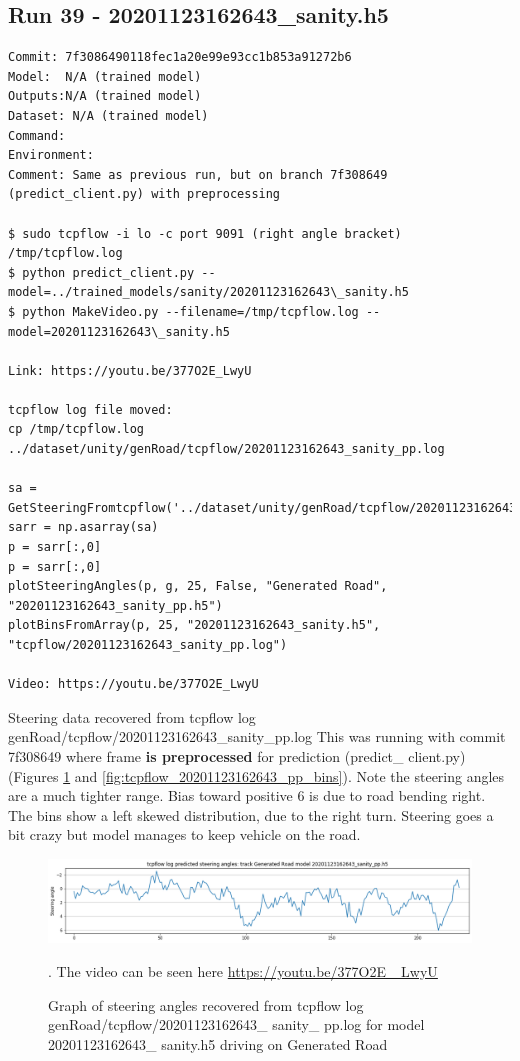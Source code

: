 \subsection{Run 39 - 20201123162643\_sanity.h5}
\begin{verbatim}
Commit: 7f3086490118fec1a20e99e93cc1b853a91272b6
Model:  N/A (trained model)
Outputs:N/A (trained model)
Dataset: N/A (trained model)
Command: 
Environment: 
Comment: Same as previous run, but on branch 7f308649 (predict_client.py) with preprocessing

$ sudo tcpflow -i lo -c port 9091 (right angle bracket) /tmp/tcpflow.log
$ python predict_client.py --model=../trained_models/sanity/20201123162643\_sanity.h5
$ python MakeVideo.py --filename=/tmp/tcpflow.log --model=20201123162643\_sanity.h5

Link: https://youtu.be/377O2E_LwyU

tcpflow log file moved:
cp /tmp/tcpflow.log ../dataset/unity/genRoad/tcpflow/20201123162643_sanity_pp.log

sa = GetSteeringFromtcpflow('../dataset/unity/genRoad/tcpflow/20201123162643_sanity_pp.log')
sarr = np.asarray(sa)
p = sarr[:,0]
p = sarr[:,0]  
plotSteeringAngles(p, g, 25, False, "Generated Road", "20201123162643_sanity_pp.h5")
plotBinsFromArray(p, 25, "20201123162643_sanity.h5", "tcpflow/20201123162643_sanity_pp.log")

Video: https://youtu.be/377O2E_LwyU
\end{verbatim}

Steering data recovered from tcpflow log genRoad/tcpflow/20201123162643\_sanity\_pp.log
This was running with commit 7f308649 where frame \textbf{is preprocessed} for prediction (predict\_ client.py) (Figures  \ref{fig:tcpflow_20201123162643_pp_graph} and  \ref{fig:tcpflow_20201123162643_pp_bins}). 
Note the steering angles are a much tighter range. Bias toward positive 6 is due to road bending right.
The bins show a left skewed distribution, due to the right turn. Steering goes a bit crazy but model
manages to keep vehicle on the road.

\begin{figure}[ht]
 \centering 
 \includegraphics[width=\textwidth]{Figures/tcpflow_20201123162643_sanity_pp_graph.png}
 \caption{Graph of steering angles recovered from tcpflow log genRoad/tcpflow/20201123162643\_ sanity\_  pp.log for model 20201123162643\_ sanity.h5 driving on Generated Road}. The video can be seen here \href{https://youtu.be/377O2E\_ LwyU}{https://youtu.be/377O2E\_ LwyU}
 \label{fig:tcpflow_20201123162643_pp_graph}
\end{figure}

